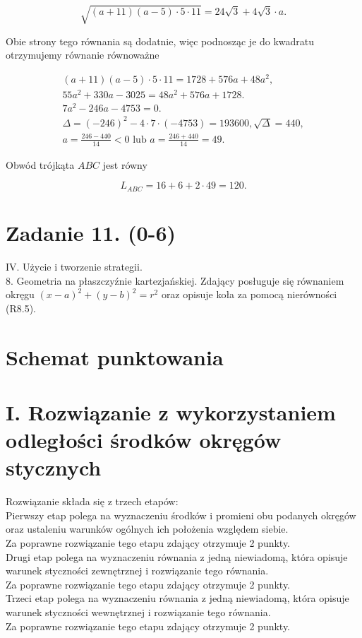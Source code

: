 \documentclass[10pt]{article}
\begin{document}
$$
\sqrt{(a+11)(a-5) \cdot 5 \cdot 11}=24 \sqrt{3}+4 \sqrt{3} \cdot a .
$$

Obie strony tego równania są dodatnie, więc podnosząc je do kwadratu otrzymujemy równanie równoważne

$$
\begin{gathered}
(a+11)(a-5) \cdot 5 \cdot 11=1728+576 a+48 a^{2}, \\
55 a^{2}+330 a-3025=48 a^{2}+576 a+1728 . \\
7 a^{2}-246 a-4753=0 . \\
\Delta=(-246)^{2}-4 \cdot 7 \cdot(-4753)=193600, \sqrt{\Delta}=440, \\
a=\frac{246-440}{14}<0 \text { lub } a=\frac{246+440}{14}=49 .
\end{gathered}
$$

Obwód trójkąta $A B C$ jest równy

$$
L_{A B C}=16+6+2 \cdot 49=120 .
$$

\section*{Zadanie 11. (0-6)}
IV. Użycie i tworzenie strategii.\\
8. Geometria na płaszczyźnie kartezjańskiej. Zdający posługuje się równaniem okręgu $(x-a)^{2}+(y-b)^{2}=r^{2}$ oraz opisuje koła za pomocą nierówności (R8.5).

\section*{Schemat punktowania}
\section*{I. Rozwiązanie z wykorzystaniem odległości środków okręgów stycznych}
Rozwiązanie składa się z trzech etapów:\\
Pierwszy etap polega na wyznaczeniu środków i promieni obu podanych okręgów oraz ustaleniu warunków ogólnych ich położenia względem siebie.\\
Za poprawne rozwiązanie tego etapu zdający otrzymuje 2 punkty.\\
Drugi etap polega na wyznaczeniu równania z jedną niewiadomą, która opisuje warunek styczności zewnętrznej i rozwiązanie tego równania.\\
Za poprawne rozwiązanie tego etapu zdający otrzymuje 2 punkty.\\
Trzeci etap polega na wyznaczeniu równania z jedną niewiadomą, która opisuje warunek styczności wewnętrznej i rozwiązanie tego równania.\\
Za poprawne rozwiązanie tego etapu zdający otrzymuje 2 punkty.
\end{document}
